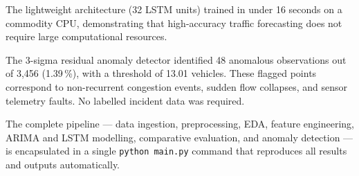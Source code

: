 \documentclass[12pt,a4paper]{article}
\begin{document}
The lightweight architecture (32 LSTM units) trained in under 16 seconds on a commodity
CPU, demonstrating that high-accuracy traffic forecasting does not require large
computational resources.

The 3-sigma residual anomaly detector identified 48 anomalous observations out of 3,456
(1.39\,\%), with a threshold of 13.01 vehicles.  These flagged points correspond to
non-recurrent congestion events, sudden flow collapses, and sensor telemetry faults.
No labelled incident data was required.

The complete pipeline --- data ingestion, preprocessing, EDA, feature engineering,
ARIMA and LSTM modelling, comparative evaluation, and anomaly detection --- is
encapsulated in a single \texttt{python main.py} command that reproduces all results
and outputs automatically.
\end{document}
